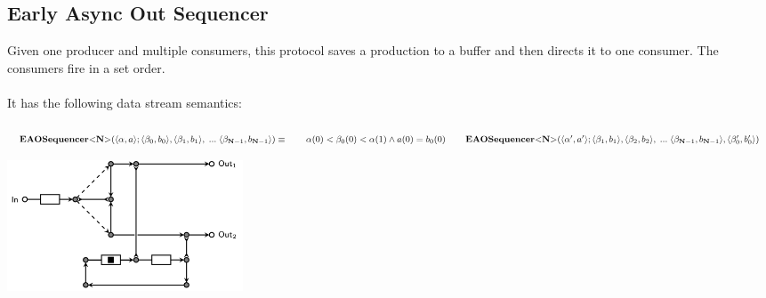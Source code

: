 \subsection{Early Async Out Sequencer}
\begin{minipage}{.65\textwidth}
  Given one producer and multiple consumers, this protocol saves a production to a buffer and then directs it to one consumer. The consumers fire in a set order.\\\\
  It has the following data stream semantics:\\\\
  $
  \vspace{0.2cm}\eaoseq (\langle \alpha, a \rangle;\langle \beta_0, b_0 \rangle, \langle \beta_1, b_1 \rangle,\;...\; \langle \beta_{\textbf{N}-1}, b_{\textbf{N}-1} \rangle) \equiv
  \vspace{0.2cm} \hphantom \qquad \alpha(0) < \beta_0(0) < \alpha(1) \land a(0) = b_0(0) \\
  \hphantom \qquad \eaoseq (\langle \alpha', a' \rangle; \langle \beta_1, b_1 \rangle,\langle \beta_2, b_2 \rangle,\;...\; \langle \beta_{\textbf{N}-1}, b_{\textbf{N}-1} \rangle, \langle \beta_0', b_0' \rangle)
  $
\end{minipage}\hspace{0.05cm}
\begin{minipage}{.25\textwidth}
  \includegraphics[width=7cm]{img/eaoseq.png}\\
\end{minipage}
